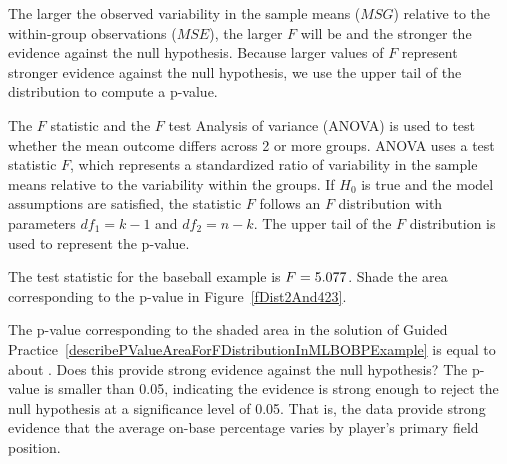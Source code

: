 The larger the observed variability in the sample means ($MSG$) relative to the within-group observations ($MSE$), the larger $F$ will be and the stronger the evidence against the null hypothesis. Because larger values of $F$ represent stronger evidence against the null hypothesis, we use the upper tail of the distribution to compute a p-value.

\begin{onebox}{The $F$ statistic and the $F$ test}
Analysis of variance (ANOVA) is used to test whether the mean outcome differs across 2 or more groups. ANOVA uses a test statistic $F$, which represents a standardized ratio of variability in the sample means relative to the variability within the groups. If $H_0$ is true and the model assumptions are satisfied, the statistic $F$ follows an $F$ distribution with parameters $df_{1}=k-1$ and $df_{2}=n-k$. The upper tail of the $F$ distribution is used to represent the p-value.
\end{onebox}

\begin{exercisewrap}
\begin{nexercise}
\label{describePValueAreaForFDistributionInMLBOBPExample}%
The test statistic for the baseball example is $F = 5.077{}$. Shade the area corresponding to the p-value in Figure~\ref{fDist2And423}. \footnotemark{}
\end{nexercise}
\end{exercisewrap}

\begin{examplewrap}
\begin{nexample}{The p-value corresponding to the shaded area in the solution of Guided Practice~\ref{describePValueAreaForFDistributionInMLBOBPExample} is equal to about \mlbPvalue{}. Does this provide strong evidence against the null hypothesis?}
The p-value is smaller than 0.05, indicating the evidence is strong enough to reject the null hypothesis at a significance level of 0.05. That is, the data provide strong evidence that the average on-base percentage varies by player's primary field position.
\end{nexample}
\end{examplewrap}


